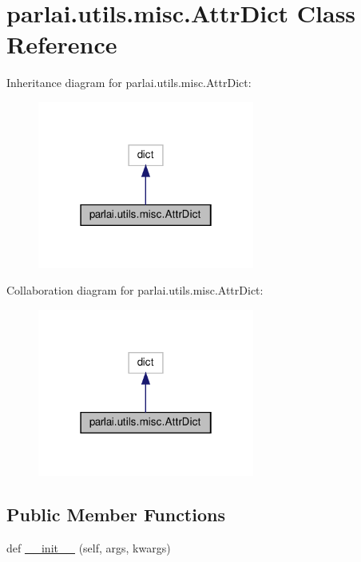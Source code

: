 \hypertarget{classparlai_1_1utils_1_1misc_1_1AttrDict}{}\section{parlai.\+utils.\+misc.\+Attr\+Dict Class Reference}
\label{classparlai_1_1utils_1_1misc_1_1AttrDict}


Inheritance diagram for parlai.\+utils.\+misc.\+Attr\+Dict\+:
\nopagebreak
\begin{figure}[H]
\begin{center}
\leavevmode
\includegraphics[width=202pt]{df/db8/classparlai_1_1utils_1_1misc_1_1AttrDict__inherit__graph}
\end{center}
\end{figure}


Collaboration diagram for parlai.\+utils.\+misc.\+Attr\+Dict\+:
\nopagebreak
\begin{figure}[H]
\begin{center}
\leavevmode
\includegraphics[width=202pt]{dc/d90/classparlai_1_1utils_1_1misc_1_1AttrDict__coll__graph}
\end{center}
\end{figure}
\subsection*{Public Member Functions}
\begin{DoxyCompactItemize}
\item 
def \hyperlink{classparlai_1_1utils_1_1misc_1_1AttrDict_a8a0ed33202adee184fc7ec06cf89a7ba}{\+\_\+\+\_\+init\+\_\+\+\_\+} (self, args, kwargs)
\end{DoxyCompactItemize}


